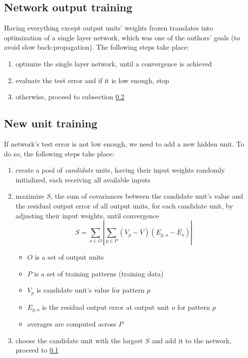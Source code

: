 \documentclass[a4paper,twocolumn]{article}
\newcommand*\mean[1]{\overline{#1}}
\begin{document}
\subsection{Network output training} \label{ssec:nn}
Having everything except output units' weights frozen translates into optimization of a single layer network, which was one of the authors' goals (to avoid slow back-propagation). The following steps take place:
\begin{enumerate}
    \item optimize the single layer network, until a convergence is achieved
    \item evaluate the test error and if it is low enough, stop
    \item otherwise, proceed to subsection \ref{ssec:unit}
\end{enumerate}

\subsection{New unit training} \label{ssec:unit}
If network's test error is not low enough, we need to add a new hidden unit. To do so, the following steps take place:
\begin{enumerate}
    \item create a pool of \textit{candidate} units, having their input weights randomly initialized, each receiving all available inputs
    \item maximize $S$, the sum of covariances between the candidate unit's value and the residual output error of all output units, for each candidate unit, by adjusting their input weights, until convergence
\[
    S = \sum_{o \in O} \left| \sum_{p \in P} (V_p - \mean{V})(E_{p,o} - \mean{E_o}) \right|
\]
    \begin{itemize}
        \item $O$ is a set of output units
        \item $P$ is a set of training patterns (training data)
        \item $V_p$ is candidate unit's value for pattern $p$
        \item $E_{p,o}$ is the residual output error at output unit $o$ for pattern $p$
        \item averages are computed across $P$
    \end{itemize}

    \item choose the candidate unit with the largest $S$ and add it to the network, proceed to \ref{ssec:nn}
\end{enumerate}
\end{document}
